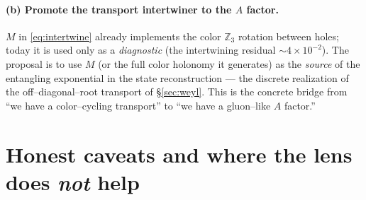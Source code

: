 \documentclass[11pt,oneside]{article}
\newcommand{\Z}{\mathbb{Z}}
\theoremstyle{plain}
\begin{document}
\paragraph{(b) Promote the transport intertwiner to the $A$ factor.}
$M$ in \eqref{eq:intertwine} already implements the color $\Z_3$ rotation between
holes; today it is used only as a \emph{diagnostic} (the intertwining residual
${\sim}4\times10^{-2}$). The proposal is to use $M$ (or the full color holonomy it
generates) as the \emph{source} of the entangling exponential in the state
reconstruction --- the discrete realization of the off--diagonal--root transport
of \S\ref{sec:weyl}. This is the concrete bridge from ``we have a color--cycling
transport'' to ``we have a gluon--like $A$ factor.''

\section{Honest caveats and where the lens does \emph{not} help}
\label{sec:caveats}
\end{document}
